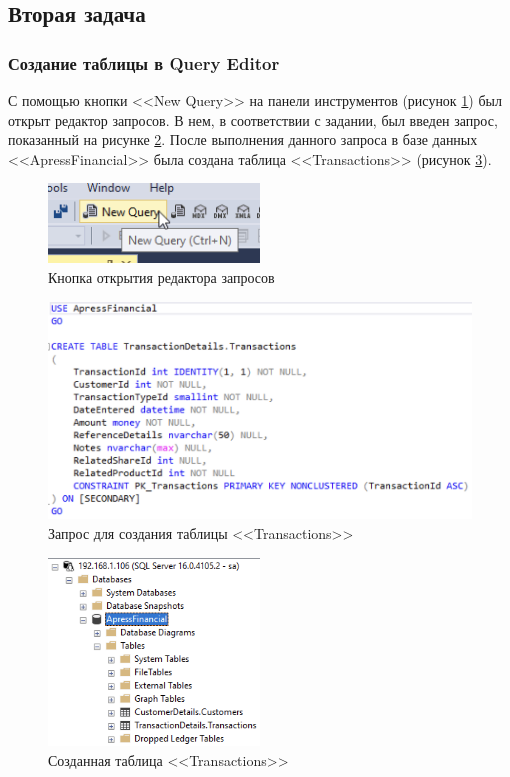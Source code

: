 \documentclass[a4paper, 14pt]{extarticle}
\begin{document}
\subsection{Вторая задача}

\subsubsection{Создание таблицы в Query Editor}

С помощью кнопки <<New Query>> на панели инструментов (рисунок
\ref{fig:task-2-1}) был открыт редактор запросов. В нем, в соответствии с
задании, был введен запрос, показанный на рисунке \ref{fig:task-2-2}. После
выполнения данного запроса в базе данных
<<\foreignlanguage{english}{ApressFinancial}>> была создана таблица
<<Transactions>> (рисунок \ref{fig:task-2-3}).

\begin{figure}[H]
  \centering
  \includegraphics[width=0.5\textwidth]{images/task-2/1.png}
  \caption{Кнопка открытия редактора запросов}
  \label{fig:task-2-1}
\end{figure}

\begin{figure}[H]
  \centering
  \includegraphics[width=\textwidth]{images/task-2/2.png}
  \caption{Запрос для создания таблицы <<Transactions>>}
  \label{fig:task-2-2}
\end{figure}

\begin{figure}[H]
  \centering
  \includegraphics[width=0.5\textwidth]{images/task-2/3.png}
  \caption{Созданная таблица <<Transactions>>}
  \label{fig:task-2-3}
\end{figure}
\end{document}
